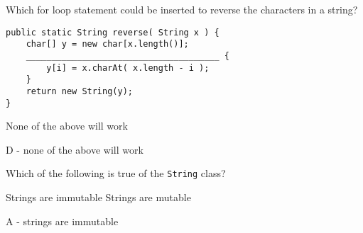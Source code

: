\documentclass[11pt,answers]{exam}
\begin{document}
\begin{questions}
\question[1] Which for loop statement could be inserted to reverse the characters in a string?
\begin{lstlisting} 
public static String reverse( String x ) {
	char[] y = new char[x.length()];
	______________________________________ {
		y[i] = x.charAt( x.length - i );
	}
	return new String(y);
}	
\end{lstlisting}
\begin{choices}
	\choice None of the above will work
\end{choices}
\begin{solution}
  D - none of the above will work	
\end{solution}



\question[1] Which of the following is true of the {\tt String} class?
\begin{choices}
	\choice Strings are immutable
	\choice Strings are mutable
\end{choices}
\begin{solution}
  A - strings are immutable	
\end{solution}


\end{questions}
\end{document}
